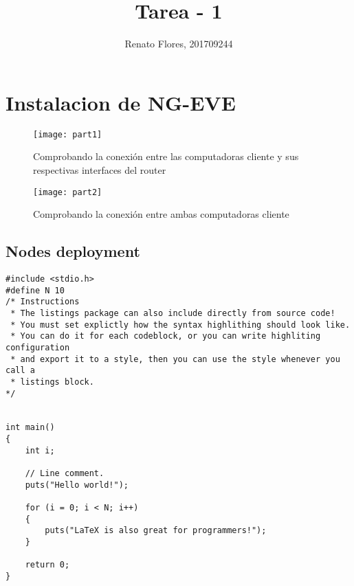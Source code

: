 \documentclass{article} %
\author{Renato Flores, 201709244}
\title{Tarea - 1}
\begin{document}
\maketitle

\section{Instalacion de NG-EVE}
	\blindtext
	\begin{figure}[h]
		\texttt{[image: part1]}
		 \caption{Comprobando la conexión entre las computadoras cliente y sus respectivas interfaces del router}
	    \label{fig:conn1}
	\end{figure}
	\begin{figure}[h]
		\texttt{[image: part2]}
		\caption{Comprobando la conexión entre ambas computadoras cliente}
	\end{figure}
	\FloatBarrier %
		\subsection{Nodes deployment}
			\blindtext
			\begin{lstlisting}
#include <stdio.h>
#define N 10
/* Instructions 
 * The listings package can also include directly from source code!
 * You must set explictly how the syntax highlithing should look like.
 * You can do it for each codeblock, or you can write highliting configuration 
 * and export it to a style, then you can use the style whenever you call a 
 * listings block.
*/


int main()
{
    int i;

    // Line comment.
    puts("Hello world!");

    for (i = 0; i < N; i++)
    {
        puts("LaTeX is also great for programmers!");
    }

    return 0;
}
		\end{lstlisting} 
\end{document}
